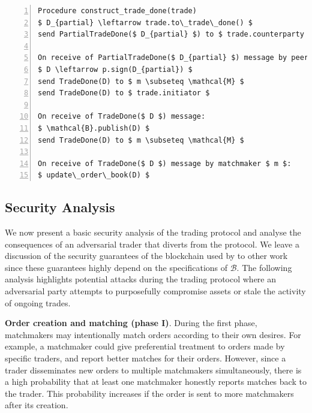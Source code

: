 \begin{lstlisting}[firstnumber=1,caption={Phases V: Finalization of a trade.},label={alg:phase5},captionpos=b,numbers=left,float=t, tabsize=2, basicstyle=\footnotesize\ttfamily, mathescape=true, emph={while, if, then, do, Procedure, record, send, initiate, receive, in, foreach, ignore, else},emphstyle=\bf, frame=TB]
Procedure construct_trade_done(trade)
$ D_{partial} \leftarrow trade.to\_trade\_done() $
send PartialTradeDone($ D_{partial} $) to $ trade.counterparty $

On receive of PartialTradeDone($ D_{partial} $) message by peer $ p $:
$ D \leftarrow p.sign(D_{partial}) $
send TradeDone(D) to $ m \subseteq \mathcal{M} $
send TradeDone(D) to $ trade.initiator $

On receive of TradeDone($ D $) message:
$ \mathcal{B}.publish(D) $
send TradeDone(D) to $ m \subseteq \mathcal{M} $

On receive of TradeDone($ D $) message by matchmaker $ m $:
$ update\_order\_book(D) $
\end{lstlisting}

\subsection{Security Analysis} \label{sec:analysis}
We now present a basic security analysis of the \ModelName{} trading protocol and analyse the consequences of an adversarial trader that diverts from the protocol.
We leave a discussion of the security guarantees of the blockchain used by \ModelName{} to other work since these guarantees highly depend on the specifications of $ \mathcal{B} $.
The following analysis highlights potential attacks during the \ModelName{} trading protocol where an adversarial party attempts to purposefully compromise assets or stale  the activity of ongoing trades.

\textbf{Order creation and matching (phase I)}.
During the first phase, matchmakers may intentionally match orders according to their own desires.
For example, a matchmaker could give preferential treatment to orders made by specific traders, and report better matches for their orders.
However, since a trader disseminates new orders to multiple matchmakers simultaneously, there is a high probability that at least one matchmaker honestly reports matches back to the trader.
This probability increases if the order is sent to more matchmakers after its creation.

